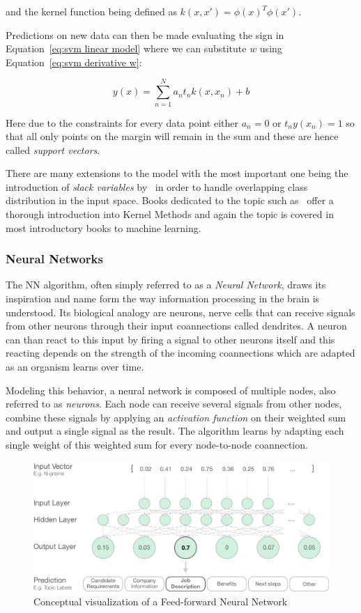 and the kernel function being defined as $k(x, x') = \phi(x)^T \phi(x')$.

Predictions on new data can then be made evaluating the sign in Equation~\ref{eq:svm linear model} where we can substitute $w$ using Equation~\ref{eq:svm derivative w}:

\begin{equation}
	y(x) = \sum_{n=1}^N a_n t_n k(x, x_n) + b
\end{equation}

Here due to the constraints for every data point either $a_n = 0$ or $t_n y(x_n) = 1$ so that all only points on the margin will remain in the sum and these are hence called \emph{support vectors}.

There are many extensions to the model with the most important one being the introduction of \emph{slack variables} by~\cite{Cortes:aa} in order to handle overlapping class distribution in the input space. Books dedicated to the topic such as~\cite{Shawe-Taylor:2004aa} offer a thorough introduction into Kernel Methods and again the topic is covered in most introductory books to machine learning.

\subsubsection{Neural Networks}
\label{subs:Neural Networks}

The \gls{NN} algorithm, often simply referred to as a \emph{Neural Network}, draws its inspiration and name form the way information processing in the brain is understood. Its biological analogy are neurons, nerve cells that can receive signals from other neurons through their input coannections called dendrites. A neuron can than react to this input by firing a signal to other neurons itself and this reacting depends on the strength of the incoming coannections which are adapted as an organism learns over time.

Modeling this behavior, a neural network is composed of multiple nodes, also referred to as \emph{neurons}. Each node can receive several signals from other nodes, combine these signals by applying an \emph{activation function} on their weighted sum and output a single signal as the result. The algorithm learns by adapting each single weight of this weighted sum for every node-to-node coannection.

\begin{figure}[h]
  \centering
  \includegraphics[width=1\textwidth]{img/NN}
  \caption{Conceptual visualization of a Feed-forward Neural Network}
  \label{fig:NN}
\end{figure}

